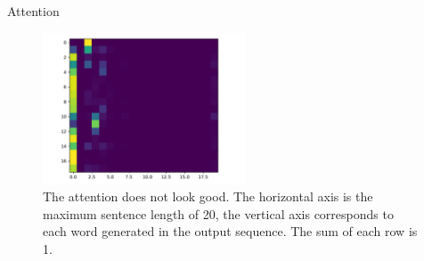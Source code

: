 \documentclass[11pt]{article}
\begin{document}
\begin{subsection}{Attention}
 \begin{figure}
  \centering
  \includegraphics[width=6cm]{imgs/att_fig}
  \caption{\label{fig:att_fig} The attention does not look good. The horizontal axis is the maximum sentence length of 20, the vertical axis corresponds to each word generated in the output sequence. The sum of each row is 1.}
\end{figure}

\end{subsection}






%
%
%
%
%


\end{document}

